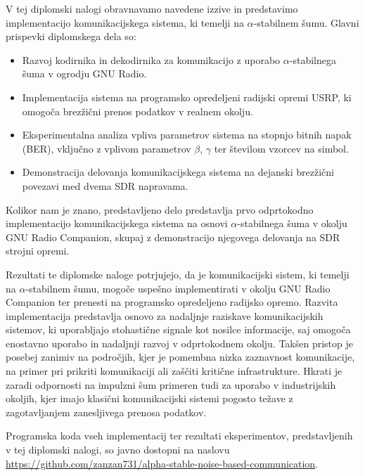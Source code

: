 \documentclass[a4paper, 12pt, openany]{book}
\begin{document}
V tej diplomski nalogi obravnavamo navedene izzive in predstavimo implementacijo komunikacijskega sistema, ki temelji na $\alpha$-stabilnem šumu. Glavni prispevki diplomskega dela so:

\begin{itemize}

\item Razvoj kodirnika in dekodirnika za komunikacijo z uporabo $\alpha$-stabilnega šuma v ogrodju GNU Radio.

\item Implementacija sistema na programsko opredeljeni radijski opremi USRP, ki omogoča brezžični prenos podatkov v realnem okolju.

\item Eksperimentalna analiza vpliva parametrov sistema na stopnjo bitnih napak (BER), vključno z vplivom parametrov $\beta$, $\gamma$ ter številom vzorcev na simbol.

\item Demonstracija delovanja komunikacijskega sistema na dejanski brezžični povezavi med dvema SDR napravama.

\end{itemize}

Kolikor nam je znano, predstavljeno delo predstavlja prvo odprtokodno implementacijo komunikacijskega sistema na osnovi $\alpha$-stabilnega šuma v okolju GNU Radio Companion, skupaj z demonstracijo njegovega delovanja na SDR strojni opremi.

Rezultati te diplomske naloge potrjujejo, da je komunikacijski sistem, ki temelji na $\alpha$-stabilnem šumu, mogoče uspešno implementirati v okolju GNU Radio Companion ter prenesti na programsko opredeljeno radijsko opremo. Razvita implementacija predstavlja osnovo za nadaljnje raziskave komunikacijskih sistemov, ki uporabljajo stohastične signale kot nosilce informacije, saj omogoča enostavno uporabo in nadaljnji razvoj v odprtokodnem okolju. Takšen pristop je posebej zanimiv na področjih, kjer je pomembna nizka zaznavnost komunikacije, na primer pri prikriti komunikaciji ali zaščiti kritične infrastrukture. Hkrati je zaradi odpornosti na impulzni šum primeren tudi za uporabo v industrijskih okoljih, kjer imajo klasični komunikacijski sistemi pogosto težave z zagotavljanjem zanesljivega prenosa podatkov.

Programska koda vseh implementacij ter rezultati eksperimentov, predstavljenih v tej diplomski nalogi, so javno dostopni na naslovu \url{https://github.com/zanzan731/alpha-stable-noise-based-communication}.
\end{document}
